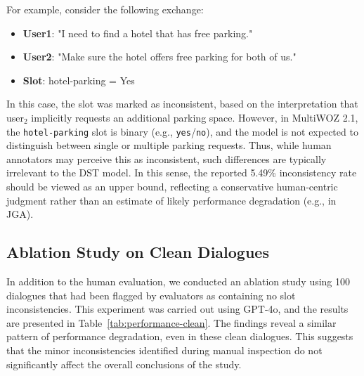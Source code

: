 For example, consider the following exchange:

\begin{itemize}
\item \textbf{User1}: "I need to find a hotel that has free parking."
\item \textbf{User2}: "Make sure the hotel offers free parking for both of us."
\item \textbf{Slot}: hotel-parking = Yes
\end{itemize}

In this case, the slot was marked as inconsistent, based on the interpretation that user$_2$ implicitly requests an additional parking space. However, in MultiWOZ 2.1, the \texttt{hotel-parking} slot is binary (e.g., \texttt{yes}/\texttt{no}), and the model is not expected to distinguish between single or multiple parking requests. Thus, while human annotators may perceive this as inconsistent, such differences are typically irrelevant to the DST model. In this sense, the reported 5.49\% inconsistency rate should be viewed as an upper bound, reflecting a conservative human-centric judgment rather than an estimate of likely performance degradation (e.g., in JGA).

\begin{table}[]
\centering
\caption{Results of the human evaluation. A higher ratio indicates better performance.}
\label{tab:human-eval}
\end{table}

\subsection{Ablation Study on Clean Dialogues}

In addition to the human evaluation, we conducted an ablation study using 100 dialogues that had been flagged by evaluators as containing no slot inconsistencies. This experiment was carried out using GPT-4o, and the results are presented in Table~\ref{tab:performance-clean}. The findings reveal a similar pattern of performance degradation, even in these clean dialogues. This suggests that the minor inconsistencies identified during manual inspection do not significantly affect the overall conclusions of the study.



